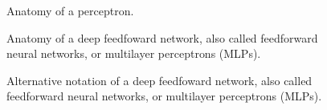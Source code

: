 \documentclass{article}
\begin{document}
    \begin{figure}[!htp]
        \centering
        
        \caption{Anatomy of a perceptron.}
        \label{fig:perceptron}
    \end{figure}

    \begin{figure}[!htp]
        \centering
        
        \caption{Anatomy of a deep feedfoward network, also called feedforward neural networks, or multilayer perceptrons (MLPs).}
        \label{fig:mlp}
    \end{figure}

    \begin{figure}[!htp]
        \centering
        
        \caption{Alternative notation of a deep feedfoward network, also called feedforward neural networks, or multilayer perceptrons (MLPs).}
        \label{fig:mlp-vec}
    \end{figure}

    
    
    
\end{document}
